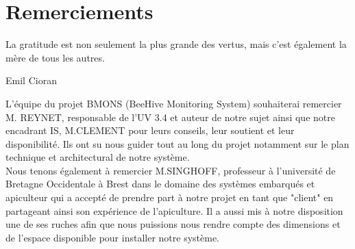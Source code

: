 
\chapter{Remerciements}
\epigraph{La gratitude est non seulement la plus grande des vertus, mais c'est également la mère de tous les autres.}{Emil Cioran}

L'équipe du projet BMONS (BeeHive Monitoring System) souhaiterai remercier M. REYNET, responsable de l'UV 3.4 et auteur de notre sujet ainsi que notre encadrant IS, M.CLEMENT pour leurs conseils, leur soutient et leur disponibilité. Ils ont su nous guider tout au long du projet notamment sur le plan technique et architectural de notre système. \\

Nous tenons également à remercier M.SINGHOFF, professeur à l'université de Bretagne Occidentale à Brest dans le domaine des systèmes embarqués et apiculteur qui a accepté de prendre part à notre projet en tant que "client" en partageant ainsi son expérience de l'apiculture. Il a aussi mis à notre disposition une de ses ruches afin que nous puissions nous rendre compte des dimensions et de l'espace disponible pour installer notre système.
       
 
